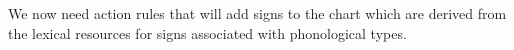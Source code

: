    

We now need action rules that will add signs to the chart which are
derived from the lexical resources for signs associated with
phonological types.  %

